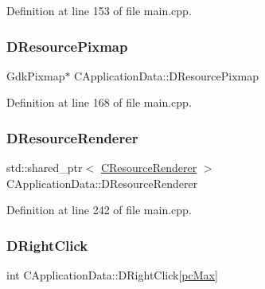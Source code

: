 Definition at line 153 of file main.\+cpp.

\hypertarget{classCApplicationData_aa9faf270fb2d769855fa5d787a883a83}{}\label{classCApplicationData_aa9faf270fb2d769855fa5d787a883a83} 
\subsubsection{\texorpdfstring{D\+Resource\+Pixmap}{DResourcePixmap}}
{\footnotesize\ttfamily Gdk\+Pixmap$\ast$ C\+Application\+Data\+::\+D\+Resource\+Pixmap\hspace{0.3cm}{\ttfamily [protected]}}



Definition at line 168 of file main.\+cpp.

\hypertarget{classCApplicationData_ac912b3f9b8e9a8c1b49eeadac315284f}{}\label{classCApplicationData_ac912b3f9b8e9a8c1b49eeadac315284f} 
\subsubsection{\texorpdfstring{D\+Resource\+Renderer}{DResourceRenderer}}
{\footnotesize\ttfamily std\+::shared\+\_\+ptr$<$ \hyperlink{classCResourceRenderer}{C\+Resource\+Renderer} $>$ C\+Application\+Data\+::\+D\+Resource\+Renderer\hspace{0.3cm}{\ttfamily [protected]}}



Definition at line 242 of file main.\+cpp.

\hypertarget{classCApplicationData_a845b854113fb8742338ada01af8b9351}{}\label{classCApplicationData_a845b854113fb8742338ada01af8b9351} 
\subsubsection{\texorpdfstring{D\+Right\+Click}{DRightClick}}
{\footnotesize\ttfamily int C\+Application\+Data\+::\+D\+Right\+Click\mbox{[}\hyperlink{GameDataTypes_8h_aafb0ca75933357ff28a6d7efbdd7602fa594a5c8dd3987f24e8a0f23f1a72cd34}{pc\+Max}\mbox{]}\hspace{0.3cm}{\ttfamily [protected]}}



